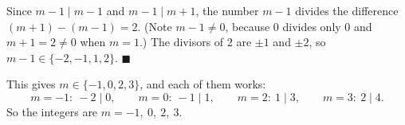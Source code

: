 Since $m-1\mid m-1$ and $m-1\mid m+1$, the number $m-1$ divides the difference $(m+1)-(m-1)=2$. (Note $m-1\ne0$, because $0$ divides only $0$ and $m+1=2\ne0$ when $m=1$.) The divisors of $2$ are $\pm1$ and $\pm2$, so $m-1\in\{-2,-1,1,2\}$. $\blacksquare$

This gives $m\in\{-1,0,2,3\}$, and each of them works:
\[m=-1:\ -2\mid0,\qquad m=0:\ -1\mid1,\qquad m=2:\ 1\mid3,\qquad m=3:\ 2\mid4.\]
So the integers are $\boxed{m=-1,\ 0,\ 2,\ 3}$.
